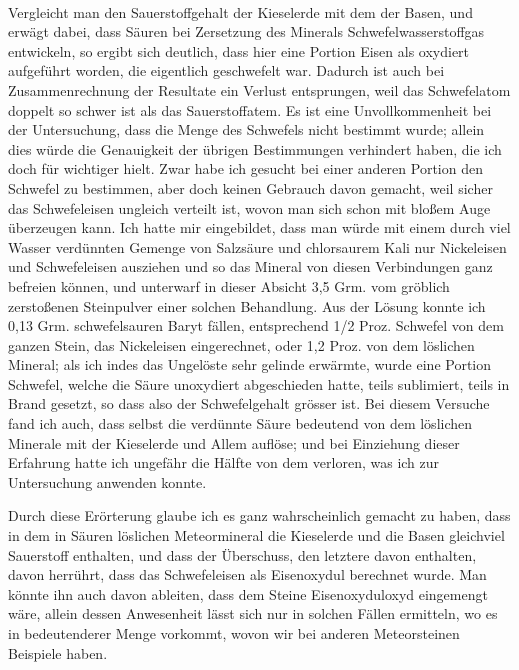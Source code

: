 \documentclass[a4paper, 11pt, oneside]{article}
\begin{document}
\paragraph{}
Vergleicht man den Sauerstoffgehalt der Kieselerde mit dem der Basen, und erwägt dabei, dass Säuren bei Zersetzung des Minerals Schwefelwasserstoffgas entwickeln, so ergibt sich deutlich, dass hier eine Portion Eisen als oxydiert aufgeführt worden, die eigentlich geschwefelt war. Dadurch ist auch bei Zusammenrechnung der Resultate ein Verlust entsprungen, weil das Schwefelatom doppelt so schwer ist als das Sauerstoffatem. Es ist eine Unvollkommenheit bei der Untersuchung, dass die Menge des Schwefels nicht bestimmt wurde; allein dies würde die Genauigkeit der übrigen Bestimmungen verhindert haben, die ich doch für wichtiger hielt. Zwar habe ich gesucht bei einer anderen Portion den Schwefel zu bestimmen, aber doch keinen Gebrauch davon gemacht, weil sicher das Schwefeleisen ungleich verteilt ist, wovon man sich schon mit bloßem Auge überzeugen kann. Ich hatte mir eingebildet, dass man würde mit einem durch viel Wasser verdünnten Gemenge von Salzsäure und chlorsaurem Kali nur Nickeleisen und Schwefeleisen ausziehen und so das Mineral von diesen Verbindungen ganz befreien können, und unterwarf in dieser Absicht 3,5 Grm. vom gröblich zerstoßenen Steinpulver einer solchen Behandlung. Aus der Lösung konnte ich 0,13 Grm. schwefelsauren Baryt fällen, entsprechend 1/2 Proz. Schwefel von dem ganzen Stein, das Nickeleisen eingerechnet, oder 1,2 Proz. von dem löslichen Mineral; als ich indes das Ungelöste sehr gelinde erwärmte, wurde eine Portion Schwefel, welche die Säure unoxydiert abgeschieden hatte, teils sublimiert, teils in Brand gesetzt, so dass also der Schwefelgehalt grösser ist. Bei diesem Versuche fand ich auch, dass selbst die verdünnte Säure bedeutend von dem löslichen Minerale mit der Kieselerde und Allem auflöse; und bei Einziehung dieser Erfahrung hatte ich ungefähr die Hälfte von dem verloren, was ich zur Untersuchung anwenden konnte.

Durch diese Erörterung glaube ich es ganz wahrscheinlich gemacht zu haben, dass in dem in Säuren löslichen Meteormineral die Kieselerde und die Basen gleichviel Sauerstoff enthalten, und dass der Überschuss, den letztere davon enthalten, davon herrührt, dass das Schwefeleisen als Eisenoxydul berechnet wurde. Man könnte ihn auch davon ableiten, dass dem Steine Eisenoxyduloxyd eingemengt wäre, allein dessen Anwesenheit lässt sich nur in solchen Fällen ermitteln, wo es in bedeutenderer Menge vorkommt, wovon wir bei anderen Meteorsteinen Beispiele haben.
\end{document}

